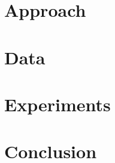 \documentclass[sigconf]{acmart}
\begin{document}

\section{Approach}


\section{Data}


\section{Experiments}


\section{Conclusion}


\begin{acks}
\end{acks}




\end{document}
